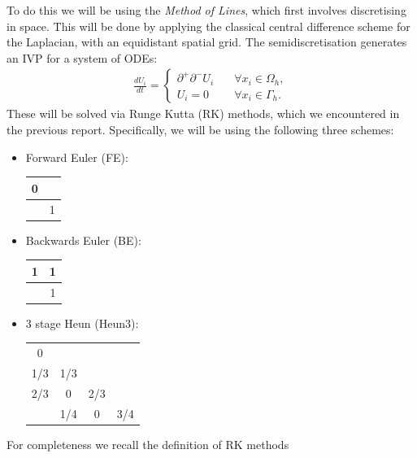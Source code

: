 \documentclass[10pt]{article}
\begin{document}
To do this we will be using the \emph{Method of Lines}, which first involves discretising in space. This will be done by applying the classical central difference
scheme for the Laplacian, with an equidistant spatial grid. The semidiscretisation generates an IVP for a system of ODEs:
\begin{align*}
\frac{dU_i}{dt} =
\begin{cases}
\partial^+\partial^-U_i \quad &\forall x_i \in \Omega_h, \\
U_i = 0 \quad &\forall x_i \in \Gamma_h.
\end{cases}
\end{align*}
These will be solved via Runge Kutta (RK) methods, which we encountered in the previous report. Specifically, we will be using the following three schemes:\\
\begin{itemize}
    \item Forward Euler (FE): $\quad$
\begin{center}
\begin{tabular}{ c|c }
  0 &    \\
  \hline
    & 1  \\
\end{tabular}
\end{center}

\item Backwards Euler (BE): $\quad$
\begin{center}
\begin{tabular}{ c|c }
  1 & 1   \\
  \hline
    & 1  \\
\end{tabular}
\end{center}

\item 3 stage Heun (Heun3):
\begin{center}
\begin{tabular}{ c|c c c }
  0 & & &   \\
  1/3 & 1/3 & & \\
  2/3 & 0 & 2/3 &  \\
  \hline
    & 1/4 & 0 & 3/4  \\
\end{tabular}
\end{center}
\end{itemize}

For completeness we recall the definition of RK methods\\
\end{document}
